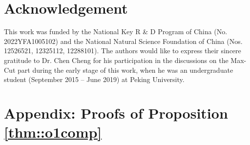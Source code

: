 \documentclass[12pt, a4paper]{article}%
\DeclareMathOperator*{\argopt}{\ensuremath{arg\,opt}}
\newcommand{\vol}{\mathrm{vol}}
\numberwithin{equation}{section}
\theoremstyle{plain}
\begin{document}
			
			\section*{Acknowledgement}
			This work was funded by the National Key R \& D Program of China (No. 2022YFA1005102) and
				the National Natural Science Foundation of China (Nos. 12526521, 12325112, 12288101). The authors would like to express their sincere gratitude to Dr. Chen Cheng for his participation in the discussions on the Max-Cut part during the early stage of this work, when he was an undergraduate student (September 2015 -- June 2019) at Peking University.
			
			
			
			
			\appendix
			\section{Appendix: Proofs of Proposition \ref{thm::o1comp}}
			\label{app:proof}
			
\end{document}
